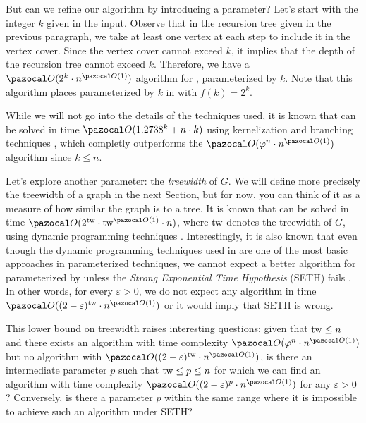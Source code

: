 \medskip

But can we refine our algorithm by introducing a parameter? Let's start with the integer $k$ given in the input. Observe that in the recursion tree given in the previous paragraph, we take at least one vertex at each step to include it in the vertex cover. Since the vertex cover cannot exceed $k$, it implies that the depth of the recursion tree cannot exceed $k$. Therefore, we have a $\O(2^k \cdot n^{\O(1)})$ algorithm for , parameterized by $k$. Note that this algorithm places  parameterized by $k$ in  with $f(k) = 2^k$.

While we will not go into the details of the techniques used, it is known that  can be solved in time $\O(1.2738^k + n\cdot k)$ using kernelization and branching techniques \cite{chen2006improved}, which completly outperforms the $\O(\varphi^n \cdot n^{\O(1)})$ algorithm since $k \leq n$.

\medskip

Let's explore another parameter: the \textit{treewidth} of $G$. We will define more precisely the treewidth of a graph in the next Section, but for now, you can think of it as a measure of how similar the graph is to a tree. It is known that  can be solved in time $\O(2^{\tw}\cdot\tw^{\O(1)}\cdot n)$, where $\text{tw}$ denotes the treewidth of $G$, using dynamic programming techniques \cite[Corollary~7.6]{cygan2015parameterized}. Interestingly, it is also known that even though the dynamic programming techniques used in \cite[Corollary~7.6]{cygan2015parameterized} are one of the most basic approaches in parameterized techniques, we cannot expect a better algorithm for  parameterized by \tw{} unless the \textit{Strong Exponential Time Hypothesis} (SETH) fails \cite{lokshtanov2011known}. In other words, for every $\varepsilon > 0$, we do not expect any algorithm in time $\O((2-\varepsilon)^\tw \cdot n^{\O(1)})$ or it would imply that SETH is wrong.

\medskip

This lower bound on treewidth raises interesting questions: given that $\text{tw}{} \leq n$ and there exists an algorithm with time complexity $\O(\varphi^n \cdot n^{\O(1)})$ but no algorithm with $\O((2 - \varepsilon)^\tw  \cdot n^{\O(1)})$, is there an intermediate parameter $p$ such that $\text{tw} \leq p \leq n$ for which we can find an algorithm with time complexity $\O((2 - \varepsilon)^p \cdot n^{\O(1)})$ for any $\varepsilon > 0$?  Conversely, is there a parameter $p$ within the same range where it is impossible to achieve such an algorithm under SETH?

